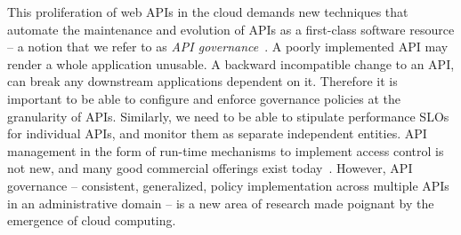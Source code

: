 This proliferation of web APIs in the cloud demands new techniques that
automate the maintenance and evolution of APIs as a first-class software
resource -- a notion that we refer
to as \textit{API governance}~\cite{6903538}. A poorly implemented API may render a whole application unusable.
A backward incompatible change to an API, can break any downstream applications dependent on it. 
Therefore it is important to be able to configure and enforce governance policies at the granularity of
APIs. Similarly, we need to be able to stipulate performance SLOs for individual APIs, and monitor
them as separate independent entities.
API management in the form of run-time mechanisms to implement
access control is not new, and many good commercial offerings exist today~\cite{3scale,apigee,layer7}.   
However, API governance -- consistent, generalized, policy
implementation across multiple APIs in an administrative domain --
is a new area of research made poignant by the emergence of cloud computing.